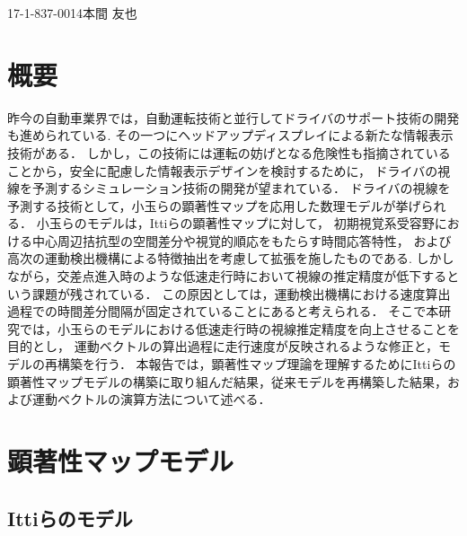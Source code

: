 

             {17-1-837-0014}{本間 友也}




\section{概要}
\vspace{-1mm}
昨今の自動車業界では，自動運転技術と並行してドライバのサポート技術の開発も進められている.
その一つにヘッドアップディスプレイによる新たな情報表示技術がある．
しかし，この技術には運転の妨げとなる危険性も指摘されていることから，安全に配慮した情報表示デザインを検討するために，
ドライバの視線を予測するシミュレーション技術の開発が望まれている．
ドライバの視線を予測する技術として，小玉らの顕著性マップを応用した数理モデル\cite{Kodama}が挙げられる．
小玉らのモデルは，Ittiらの顕著性マップ\cite{Itti}に対して，
初期視覚系受容野における中心周辺拮抗型の空間差分や視覚的順応をもたらす時間応答特性，
および高次の運動検出機構による特徴抽出を考慮して拡張を施したものである.
しかしながら，交差点進入時のような低速走行時において視線の推定精度が低下するという課題が残されている．
この原因としては，運動検出機構における速度算出過程での時間差分間隔が固定されていることにあると考えられる．
そこで本研究では，小玉らのモデルにおける低速走行時の視線推定精度を向上させることを目的とし，
運動ベクトルの算出過程に走行速度が反映されるような修正と，モデルの再構築を行う．
本報告では，顕著性マップ理論を理解するためにIttiらの顕著性マップモデルの構築に取り組んだ結果，従来モデルを再構築した結果，および運動ベクトルの演算方法について述べる．

\vspace{-3mm}

\section{顕著性マップモデル}
\vspace{-2mm}
\subsection{Ittiらのモデル}

